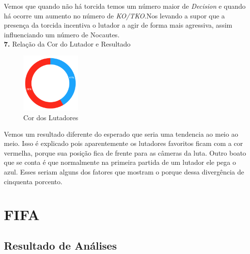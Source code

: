 \documentclass{article}
\begin{document}
Vemos que quando não há torcida temos um número maior de \textit{Decision} e quando há ocorre um aumento no número de \textit{KO/TKO}.Nos levando a supor que a presença da torcida incentiva  o lutador a agir de forma mais agressiva, assim influenciando um número de Nocautes. \\

\textbf{7.} Relação da Cor do Lutador e Resultado

\begin{figure}[H]
    \centering
    \includegraphics[width=3cm,height=3cm]{Cor dos Lutadores.png}
    \caption{Cor dos Lutadores}
    \label{fig:my_label}
\end{figure}

Vemos um resultado diferente do esperado que seria uma tendencia ao meio ao meio. Isso é explicado pois aparentemente os lutadores favoritos ficam com a cor vermelha, porque sua posição fica de frente para as câmeras da luta. Outro boato que se conta é que normalmente na primeira partida de um lutador ele pega o azul. Esses seriam alguns dos fatores que mostram o porque dessa divergência de cinquenta porcento.\\

\newpage
\section{FIFA}
\subsection{Resultado de Análises}
\end{document}

